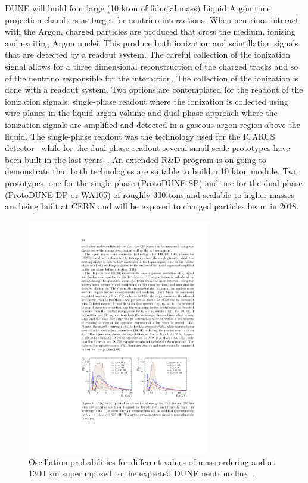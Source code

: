 DUNE will build four large (10 kton of fiducial mass) Liquid Argon time projection chambers as target for neutrino interactions. When neutrinos interact with the Argon, charged particles are produced that cross the medium, ionising and exciting Argon nuclei. This produce both ionization and scintillation signals that are detected by a readout system. The careful collection of the ionization signal allows for a three dimensional reconstruction of the charged tracks and so of the neutrino responsible for the interaction. The collection of the ionization is done with a readout system. Two options are contemplated for the readout of the ionization signals: single-phase readout where the ionization is collected using wire planes in the liquid argon volume and dual-phase approach where the ionization signals are amplified and detected in a gaseous argon region above the liquid. The single-phase readout was the technology used for the ICARUS detector~\cite{CANCI20121257} while for the dual-phase readout several small-scale prototypes have been built in the last years~\cite{}. An extended R\&D program is on-going to demonstrate that both technologies are suitable to build a 10 kton module. Two prototypes, one for the single phase (ProtoDUNE-SP) and one for the dual phase (ProtoDUNE-DP or WA105) of roughly 300 tons and scalable to higher masses are being built at CERN and will be exposed to charged particles beam in 2018.  

\begin{figure} [htbp!]
\begin{center}
\includegraphics[width=8cm]{figures/dune_flux.pdf}
\caption{\label{fig:duneflux} Oscillation probabilities for different values of mass ordering and \dcp at 1300 km superimposed to the expected DUNE neutrino flux~\cite{Diwan:2016gmz}.}
\end{center}
\end{figure}


